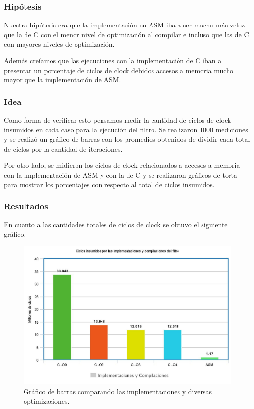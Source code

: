 \subsubsection{Hipótesis}
\par{Nuestra hipótesis era que la implementación en ASM iba a ser mucho más veloz que la de C con el menor nivel de optimización al compilar e incluso que las de C con mayores niveles de optimización.}
\par{Además creíamos que las ejecuciones con la implementación de C iban a presentar un porcentaje de ciclos de clock debidos accesos a memoria mucho mayor que la implementación de ASM.}

\subsubsection{Idea}
\par{Como forma de verificar esto pensamos medir la cantidad de ciclos de clock insumidos en cada caso para la ejecución del filtro. Se realizaron 1000 mediciones y se realizó un gráfico de barras con los promedios obtenidos de dividir cada total de ciclos por la cantidad de iteraciones.}
\par{Por otro lado, se midieron los ciclos de clock relacionados a accesos a memoria con la implementación de ASM y con la de C y se realizaron gráficos de torta para mostrar los porcentajes con respecto al total de ciclos insumidos.}

\subsubsection{Resultados}
\par{En cuanto a las cantidades totales de ciclos de clock se obtuvo el siguiente gráfico.}

\begin{figure}[h!]
\centering
\captionsetup{justification=centering}
	\includegraphics[width = 12 cm, height = 8 cm]{imagenes/CombinarASM-Cs.jpeg}
	\caption[center]{Gráfico de barras comparando las implementaciones y diversas optimizaciones.}
\end{figure}

